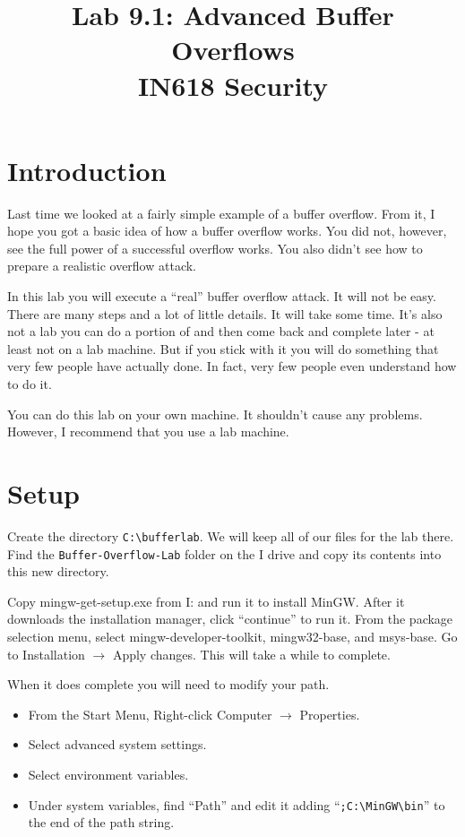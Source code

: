\documentclass{article}
\begin{document}
\title{ Lab 9.1: Advanced Buffer Overflows\\ IN618 Security}
\maketitle

\section*{Introduction}
Last time we looked at a fairly simple example of a buffer overflow.  From it, I hope
you got a basic idea of how a buffer overflow works. You did not, however, see the full
power of a successful overflow works.  You also didn't see how to prepare a realistic 
overflow attack.

In this lab you will execute a ``real'' buffer overflow attack.  It will not be easy.
There are many steps and a lot of little details.  It will take some time.  It's also not
a lab you can do a portion of and then come back and complete later - at least not on a lab
machine.  But if you stick with it you will do something that very few people have actually done.
In fact, very few people even understand how to do it.

You can do this lab on your own machine.  It shouldn't cause any problems.  However, I recommend that 
you use a lab machine.

\section{Setup}
Create the directory \texttt{C:\textbackslash{}bufferlab}.  We will keep all of our files for the lab there.  
Find the \texttt{Buffer-Overflow-Lab} folder on the I drive and copy its contents into this new 
directory. 

Copy mingw-get-setup.exe from I: and run it to install MinGW. After it downloads the installation manager, click ``continue'' to run it.  From the package selection menu, select mingw-developer-toolkit, mingw32-base, and  msys-base.  Go to Installation $\rightarrow$ Apply changes.  This will take a while to complete.

When it does complete you will need to modify your path.
\begin{itemize}
	\item From the Start Menu, Right-click Computer $\rightarrow$ Properties.
	\item Select advanced system settings.
	\item Select environment variables.
	\item Under system variables, find ``Path'' and edit it adding
		``\texttt{;C:\textbackslash{}MinGW\textbackslash{}bin}'' to the end of the path string.
\end{itemize}
\end{document}
